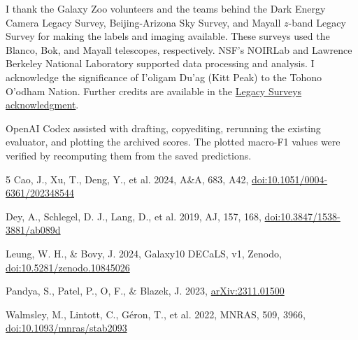 \documentclass[preprint]{aastex701}
\begin{document}
\begin{acknowledgments}
I thank the Galaxy Zoo volunteers and the teams behind the Dark Energy Camera Legacy Survey, Beijing-Arizona Sky Survey, and Mayall $z$-band Legacy Survey for making the labels and imaging available. These surveys used the Blanco, Bok, and Mayall telescopes, respectively. NSF's NOIRLab and Lawrence Berkeley National Laboratory supported data processing and analysis. I acknowledge the significance of I'oligam Du'ag (Kitt Peak) to the Tohono O'odham Nation. Further credits are available in the \href{https://www.legacysurvey.org/acknowledgment/}{Legacy Surveys acknowledgment}.

OpenAI Codex assisted with drafting, copyediting, rerunning the existing evaluator, and plotting the archived scores. The plotted macro-F1 values were verified by recomputing them from the saved predictions.
\end{acknowledgments}

\begin{thebibliography}{5}
Cao, J., Xu, T., Deng, Y., et al. 2024, A\&A, 683, A42,
\href{https://doi.org/10.1051/0004-6361/202348544}{doi:10.1051/0004-6361/202348544}

Dey, A., Schlegel, D. J., Lang, D., et al. 2019, AJ, 157, 168,
\href{https://doi.org/10.3847/1538-3881/ab089d}{doi:10.3847/1538-3881/ab089d}

Leung, W. H., \& Bovy, J. 2024, Galaxy10 DECaLS, v1, Zenodo,
\href{https://doi.org/10.5281/zenodo.10845026}{doi:10.5281/zenodo.10845026}

Pandya, S., Patel, P., O, F., \& Blazek, J. 2023,
\href{https://arxiv.org/abs/2311.01500}{arXiv:2311.01500}

Walmsley, M., Lintott, C., G\'eron, T., et al. 2022, MNRAS, 509, 3966,
\href{https://doi.org/10.1093/mnras/stab2093}{doi:10.1093/mnras/stab2093}
\end{thebibliography}
\end{document}
